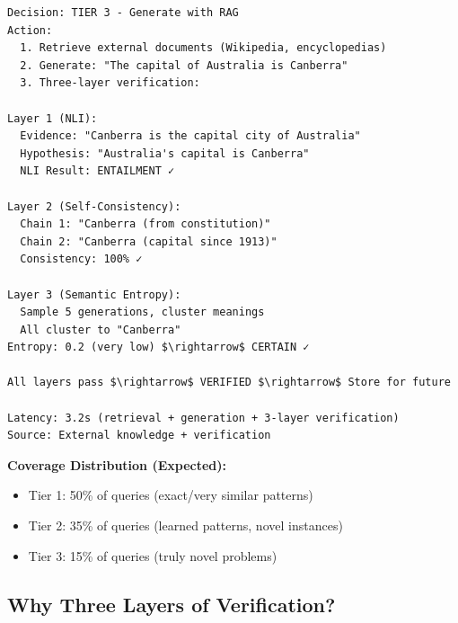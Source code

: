 \documentclass[12pt,a4paper]{article}
\theoremstyle{definition}
\begin{document}
\begin{examplebox}[title=How CAEM Decides What To Do]
\begin{verbatim}
Decision: TIER 3 - Generate with RAG
Action: 
  1. Retrieve external documents (Wikipedia, encyclopedias)
  2. Generate: "The capital of Australia is Canberra"
  3. Three-layer verification:

Layer 1 (NLI):
  Evidence: "Canberra is the capital city of Australia"
  Hypothesis: "Australia's capital is Canberra"
  NLI Result: ENTAILMENT ✓

Layer 2 (Self-Consistency):
  Chain 1: "Canberra (from constitution)"
  Chain 2: "Canberra (capital since 1913)"
  Consistency: 100% ✓

Layer 3 (Semantic Entropy):
  Sample 5 generations, cluster meanings
  All cluster to "Canberra"
Entropy: 0.2 (very low) $\rightarrow$ CERTAIN ✓

All layers pass $\rightarrow$ VERIFIED $\rightarrow$ Store for future
  
Latency: 3.2s (retrieval + generation + 3-layer verification)
Source: External knowledge + verification
\end{verbatim}

\textbf{Coverage Distribution (Expected):}
\begin{itemize}
    \item Tier 1: 50\% of queries (exact/very similar patterns)
    \item Tier 2: 35\% of queries (learned patterns, novel instances)
    \item Tier 3: 15\% of queries (truly novel problems)
\end{itemize}
\end{examplebox}

\subsection{Why Three Layers of Verification?}
\end{document}
